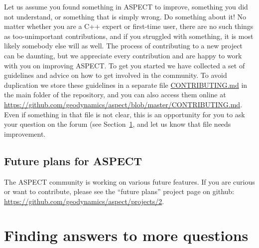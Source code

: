 \documentclass{article}
\newcommand{\aspect}{\textsc{ASPECT}}
\begin{document}
Let us assume you found something in \aspect{} to improve, something you did not
understand, or something that is simply wrong. Do something about it! No matter
whether you are a C++ expert or first-time user, there are no such things as too-unimportant
contributions, and if you struggled with something, it is most likely somebody else will
as well. The process of contributing to a new project can be daunting, but we appreciate
every contribution and are happy to work with you on improving \aspect{}. To get
you started we have collected a set of guidelines and advice on how to get involved in the
community. To avoid duplication we store these guidelines in a separate file \url{CONTRIBUTING.md}
in the main folder of the repository, and you can also access them online at \url{https://github.com/geodynamics/aspect/blob/master/CONTRIBUTING.md}. Even if something in that file is not clear, this
is an opportunity for you to ask your question on the forum (see 
Section~\ref{sec:questions-and-answers}, and let us know that file needs improvement.

\subsection{Future plans for \aspect}
\label{sec:future}

The \aspect{} community is working on various future features. If you are
curious or want to contribute, please see the ``future plans'' project page on
github: \url{https://github.com/geodynamics/aspect/projects/2}.


\section{Finding answers to more questions}
\label{sec:questions-and-answers}
\end{document}
